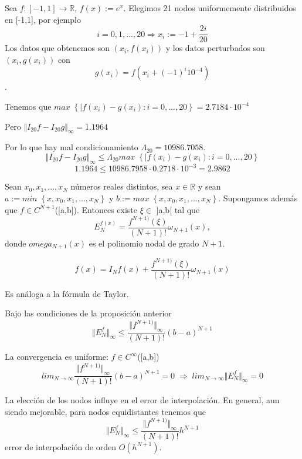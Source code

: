 \begin{ejemplo}
Sea $f : \left[ -1,1 \right] \longrightarrow \mathbb{R}$, $f(x) := e^x$. Elegimos 21 nodos uniformemente distribuidos en [-1,1], por ejemplo
\[ i=0,1,...,20 \Rightarrow x_i := -1 + \frac{2i}{20} \]
Los datos que obtenemos son $(x_i,f(x_i))$ y los datos perturbados son $(x_i,g(x_i))$ con $$g(x_i)=f(x_i+(-1)^i10^{-4})$$.

Tenemos que $max \; \left\lbrace \vert f(x_i)-g(x_i) : i=0,...,20 \right\rbrace = 2.7184 \cdot 10^{-4}$

Pero $\Vert I_{20}f-I_{20}g \Vert _\infty = 1.1964$

Por lo que hay mal condicionamiento $\Lambda _{20} = 10986.7058$.
\[ \Vert I_{20}f-I_{20}g \Vert _\infty \leq \Lambda _{20} max \; \left\lbrace \vert f(x_i)-g(x_i) : i=0,...,20 \right\rbrace \]
\[ 1.1964 \leq 10986.7958 \cdot 0.2718 \cdot 10^{-3} = 2.9862 \]
\end{ejemplo}

\begin{nprop}
Sean $x_0,x_1,...,x_N$ números reales distintos, sea $x \in \mathbb{R}$ y sean $a:=min \; \left\lbrace x,x_0,x_1,...,x_N \right\rbrace$ y $b:=max \; \left\lbrace x,x_0,x_1,...,x_N \right\rbrace$. Supongamos además que $f \in C^{N+1}$([a,b]). Entonces existe $\xi \in$ ]a,b[ tal que
\[ E_N^{f(x)}=\frac{f^{N+1)}( \xi )}{(N+1)!} \omega _{N+1}(x), \]
donde $omega _{N+1}(x)$ es el polinomio nodal de grado $N+1$.
\end{nprop}

\[ f(x) = I_Nf(x) + \frac{f^{N+1)}( \xi )}{(N+1)!} \omega _{N+1}(x) \]

Es análoga a la fórmula de Taylor.

\begin{ncor}
Bajo las condiciones de la proposición anterior
\[ \Vert E_N^f \Vert _\infty \leq \frac{\Vert f^{N+1)} \Vert _\infty }{(N+1)!} (b-a)^{N+1} \]
\end{ncor}

La convergencia es uniforme: $f \in C^{\infty}$([a,b])
\[ lim_{N \rightarrow \infty} \frac{\Vert f^{N+1)} \Vert _\infty }{(N+1)!} (b-a)^{N+1} = 0 \; \Rightarrow \; lim_{N \rightarrow \infty} \Vert E_N^f \Vert _\infty = 0 \]

La elección de los nodos influye en el error de interpolación. En general, aun siendo mejorable, para nodos equidistantes tenemos que
\[ \Vert E_N^f \Vert _\infty \leq \frac{\Vert f^{N+1)} \Vert _\infty}{(N+1)!}h^{N+1} \]
error de interpolación de orden $O \left( h^{N+1} \right)$.


